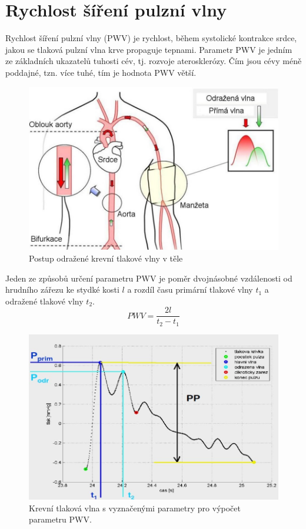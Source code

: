 \section{Rychlost šíření pulzní vlny}
Rychlost šíření pulzní vlny (PWV) je rychlost, během systolické kontrakce srdce, jakou se tlaková pulzní vlna krve propaguje tepnami. Parametr PWV je jedním ze základních ukazatelů tuhosti cév, tj. rozvoje aterosklerózy.
Čím jsou cévy méně poddajné, tzn. více tuhé, tím je hodnota PWV větší.
\begin{figure}[H]
    \caption{Postup odražené krevní tlakové vlny v těle \cite{cite:5}}
    \includegraphics[width=1\textwidth]{pictures/pwv_body.jpg}
\end{figure}
Jeden ze způsobů určení parametru PWV je poměr dvojnásobné vzdálenosti od hrudního zářezu ke stydké kosti $l$ a rozdíl času primární tlakové vlny $t_1$ a odražené tlakové vlny $t_2$.
\begin{equation} \label{eq:pwv}
    PWV = \frac{2l}{t_2 - t_1}
\end{equation}
\begin{figure}[H]
    \caption{Krevní tlaková vlna s vyznačenými parametry pro výpočet parametru PWV. \cite{cite:7}}
    \includegraphics[width=1\textwidth]{pictures/pwv_pressure_wave.jpg}
\end{figure}
